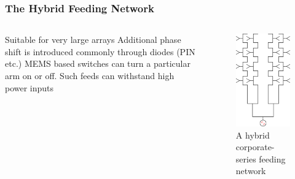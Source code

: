 \documentclass[10pt]{beamer}
\begin{document}
\begin{frame}
    \frametitle{The Hybrid Feeding Network}
    \begin{columns}[] %
        \begin{column}{.5\textwidth}
            \begin{outline}
                \1 Suitable for very large arrays
                \2 Additional phase shift is introduced commonly through diodes (PIN etc.)
                \1 MEMS based switches can turn a particular arm on or off.
                \2 Such feeds can withstand high power inputs
            \end{outline}   
        \end{column}
        \begin{column}{.5\textwidth}
            \begin{figure}[h!]
                \centering
                \includegraphics[width=.6\textwidth]{hybrid.pdf}
                \caption{A hybrid corporate-series feeding network}
            \end{figure}
        \end{column}%
    \end{columns}
\end{frame}
\end{document}

